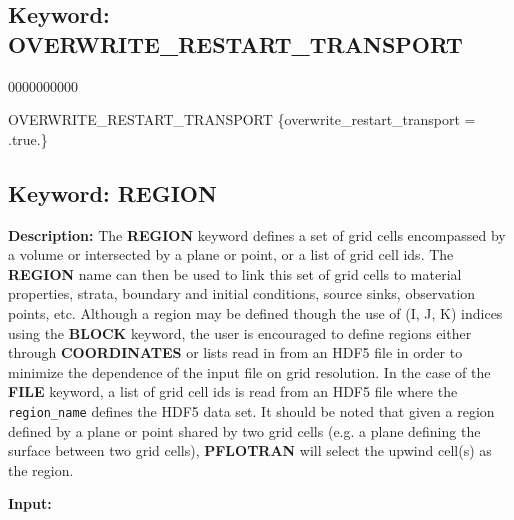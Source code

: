 \documentclass[12pt]{article}
\begin{document}
\newpage
\protect\hypertarget{target_overwrite}{}

\subsection{Keyword: OVERWRITE\_RESTART\_TRANSPORT}
\begin{deflist}{0000000000}
\item[OVERWRITE\_RESTART\_TRANSPORT] \{overwrite\_restart\_transport = .true.\}
\end{deflist}


\newpage
\protect\hypertarget{target_region}{}


\subsection{Keyword: REGION}

{\noindent\bf Description:}
The {\bf REGION} keyword defines a set of grid cells encompassed by a volume or intersected by a plane or point, or a list of grid cell ids.  The {\bf REGION} name can then be used to link this set of grid cells to material properties, strata, boundary and initial conditions, source sinks, observation points, etc.  Although a region may be defined though the use of (I, J, K) indices using the {\bf BLOCK} keyword, the user is encouraged to define regions either through {\bf COORDINATES} or lists read in from an HDF5 file in order to minimize the dependence of the input file on grid resolution.  In the case of the {\bf FILE} keyword, a list of grid cell ids is read from an HDF5 file where the {\tt region\_name} defines the HDF5 data set.  It should be noted that given a region defined by a plane or point shared by two grid cells (e.g. a plane defining the surface between two grid cells), {\bf PFLOTRAN} will select the upwind cell(s) as the region.

{\noindent\bf Input:}
\end{document}
